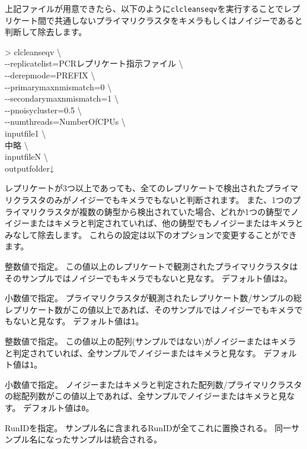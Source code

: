 \documentclass[titlepage,10pt,a4paper,english]{jsbook}
\newenvironment{cmd}{\begin{oframed}\raggedright\ttfamily\footnotesize\setlength{\baselineskip}{1.4em}}{\end{oframed}\vspace{-1em}}
\begin{document}
上記ファイルが用意できたら、以下のように\texttt{clcleanseqv}を実行することでレプリケート間で共通しないプライマリクラスタをキメラもしくはノイジーであると判断して除去します。
\begin{cmd}
{\textgreater} clcleanseqv {\textbackslash}\\
{-}{-}replicatelist=PCRレプリケート指示ファイル {\textbackslash}\\
{-}{-}derepmode=PREFIX {\textbackslash}\\
{-}{-}primarymaxnmismatch=0 {\textbackslash}\\
{-}{-}secondarymaxnmismatch=1 {\textbackslash}\\
{-}{-}pnoisycluster=0.5 {\textbackslash}\\
{-}{-}numthreads=NumberOfCPUs {\textbackslash}\\
inputfile1 {\textbackslash}\\
中略 {\textbackslash}\\
inputfileN {\textbackslash}\\
outputfolder↓
\end{cmd}
レプリケートが3つ以上であっても、全てのレプリケートで検出されたプライマリクラスタのみがノイジーでもキメラでもないと判断されます。
また、1つのプライマリクラスタが複数の鋳型から検出されていた場合、どれか1つの鋳型でノイジーまたはキメラと判定されていれば、他の鋳型でもノイジーまたはキメラとみなして除去します。
これらの設定は以下のオプションで変更することができます。
\begin{description}\small\setlength{\baselineskip}{1.1em}
\item[\texttt{{-}{-}minnreplicate}] 整数値で指定。
この値以上のレプリケートで観測されたプライマリクラスタはそのサンプルではノイジーでもキメラでもないと見なす。
デフォルト値は\texttt{2}。
\item[\texttt{{-}{-}minpreplicate}] 小数値で指定。
プライマリクラスタが観測されたレプリケート数/サンプルの総レプリケート数がこの値以上であれば、そのサンプルではノイジーでもキメラでもないと見なす。
デフォルト値は\texttt{1}。
\item[\texttt{{-}{-}minnpositive}] 整数値で指定。
この値以上の配列(サンプルではない)がノイジーまたはキメラと判定されていれば、全サンプルでノイジーまたはキメラと見なす。
デフォルト値は\texttt{1}。
\item[\texttt{{-}{-}minppositive}] 小数値で指定。
ノイジーまたはキメラと判定された配列数/プライマリクラスタの総配列数がこの値以上であれば、全サンプルでノイジーまたはキメラと見なす。
デフォルト値は\texttt{0}。
\item[\texttt{{-}{-}runname}] RunIDを指定。
サンプル名に含まれるRunIDが全てこれに置換される。
同一サンプル名になったサンプルは統合される。
\end{description}
\end{document}
